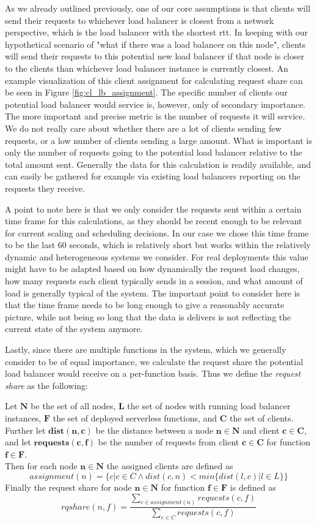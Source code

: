As we already outlined previously, one of our core assumptions is that clients will send their requests to whichever load balancer is closest from a network perspective, which is the load balancer with the shortest \gls{rtt}.
In keeping with our hypothetical scenario of "what if there was a load balancer on this node", clients will send their requests to this potential new load balancer if that node is closer to the clients than whichever load balancer instance is currently closest.
An example visualization of this client assignment for calculating request share can be seen in Figure \ref{fig:cl_lb_assignment}.
The specific number of clients our potential load balancer would service is, however, only of secondary importance. The more important and precise metric is the number of requests it will service.
We do not really care about whether there are a lot of clients sending few requests, or a low number of clients sending a large amount. What is important is only the number of requests going to the potential load balancer relative to the total amount sent.
Generally the data for this calculation is readily available, and can easily be gathered for example via existing load balancers reporting on the requests they receive.

A point to note here is that we only consider the requests sent within a certain time frame for this calculations, as they should be recent enough to be relevant for current scaling and scheduling decisions.
In our case we chose this time frame to be the last 60 seconds, which is relatively short but works within the relatively dynamic and heterogeneous systems we consider.
For real deployments this value might have to be adapted based on how dynamically the request load changes, how many requests each client typically sends in a session, and what amount of load is generally typical of the system.
The important point to consider here is that the time frame needs to be long enough to give a reasonably accurate picture, while not being so long that the data is delivers is not reflecting the current state of the system anymore.

Lastly, since there are multiple functions in the system, which we generally consider to be of equal importance, we calculate the request share the potential load balancer would receive on a per-function basis.
Thus we define the \textit{request share} as the following:

Let $\mathbf{N}$ be the set of all nodes, $\mathbf{L}$ the set of nodes with running load balancer instances, $\mathbf{F}$ the set of deployed serverless functions, and $\mathbf{C}$ the set of clients.\\
Further let $\mathbf{dist(n,c)}$ be the distance between a node $\mathbf{n \in N}$ and client $\mathbf{c \in C}$, and let $\mathbf{requests(c, f)}$ be the number of requests from client $\mathbf{c \in C}$ for function $\mathbf{f \in F}$.\\
Then for each node $\mathbf{n \in N}$ the assigned clients are defined as
\[ assignment(n) = \{c | c \in C \land dist(c,n) < min\{dist(l, c) | l \in L\}\}\]
Finally the request share for node $\mathbf{n \in N}$ for function $\mathbf{f \in F}$ is defined as
\[ rqshare(n,f) = \frac{\sum_{c \in assignment(n)}requests(c,f)}{\sum_{c \in C}requests(c,f)}\]


